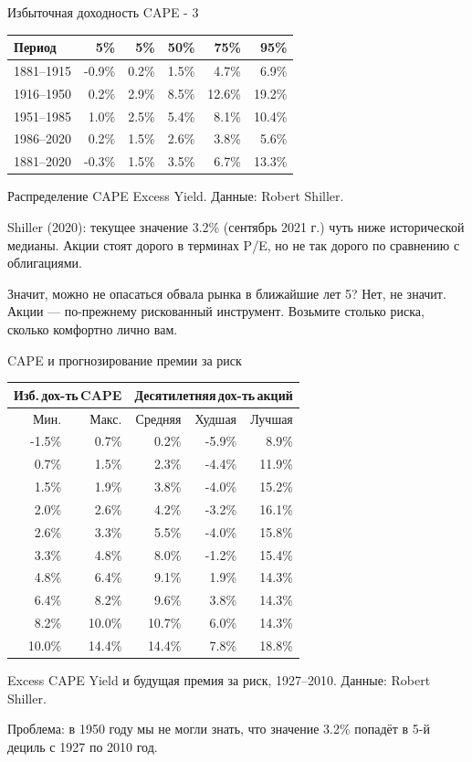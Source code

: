 \documentclass{beamer}
\begin{document}
\begin{frame}{Избыточная доходность CAPE - 3}
\centering
\begin{tabular}{l|r|r|r|r|r}
Период     &    5\% &   5\% &  50\% &   75\% &   95\% \\ \hline 
1881--1915 & -0.9\% & 0.2\% & 1.5\% &  4.7\% &  6.9\% \\ 
1916--1950 &  0.2\% & 2.9\% & 8.5\% & 12.6\% & 19.2\% \\
1951--1985 &  1.0\% & 2.5\% & 5.4\% &  8.1\% & 10.4\% \\
1986--2020 &  0.2\% & 1.5\% & \alert{2.6\%} &  3.8\% &  5.6\% \\ \hline
1881--2020 & -0.3\% & 1.5\% & \alert{3.5\%} &  6.7\% & 13.3\%
\end{tabular}

\centering
{\scriptsize Распределение CAPE Excess Yield. Данные: Robert Shiller.}

\justify
Shiller (2020): текущее значение 3.2\% (сентябрь 2021 г.) чуть ниже 
исторической медианы. Акции стоят дорого в терминах P/E, но не так дорого по 
сравнению с облигациями.

\justify
Значит, можно не опасаться обвала рынка в ближайшие лет 5? Нет, не значит. 
Акции --- по-прежнему рискованный инструмент. Возьмите столько риска, сколько 
комфортно лично вам.
\end{frame}



\begin{frame}{CAPE и прогнозирование премии за риск}
\centering
\begin{tabular}{r|r|r|r|r}
\multicolumn{2}{c|}{Изб.\,дох-ть\,CAPE} &
\multicolumn{3}{c}{Десятилетняя\,дох-ть\,акций} \\
\hline
Мин. & Макс. & Средняя & Худшая & Лучшая \\
\hline
-1.5\% &  0.7\% &  0.2\%  & -5.9\% &  8.9\% \\
 0.7\% &  1.5\% &  2.3\%  & -4.4\% & 11.9\% \\
 1.5\% &  1.9\% &  3.8\%  & -4.0\% & 15.2\% \\
 2.0\% &  2.6\% &  4.2\%  & -3.2\% & 16.1\% \\ 
\hline
 \alert{2.6\%} &  \alert{3.3\%} &  \alert{5.5\%}  & \alert{-4.0\%} & \alert{15.8\%} \\
\hline
 3.3\% &  4.8\% &  8.0\%  & -1.2\% & 15.4\% \\
 4.8\% &  6.4\% &  9.1\%  &  1.9\% & 14.3\% \\
 6.4\% &  8.2\% &  9.6\%  &  3.8\% & 14.3\% \\
 8.2\% & 10.0\% &  10.7\% &  6.0\% & 14.3\% \\ 
10.0\% & 14.4\% &  14.4\% &  7.8\% & 18.8\%  
\end{tabular}

\centering
{\scriptsize Excess CAPE Yield и будущая премия за риск, 1927--2010. Данные: Robert Shiller.}

\justify
Проблема: в 1950 году мы не могли знать, что значение 3.2\% попадёт в 5-й 
дециль с 1927 по 2010 год.
\end{frame}
\end{document}
